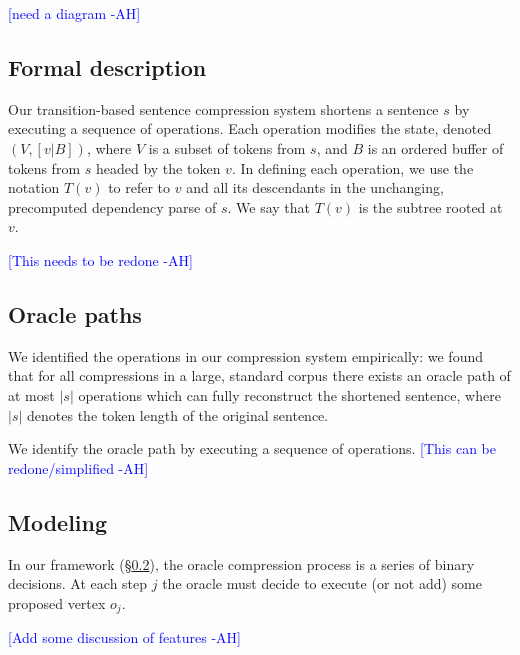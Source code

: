 \documentclass[11pt,a4paper]{article}
\newcommand{\ahcomment}[1]{\textcolor{blue}{[#1 -AH]}}
\begin{document}
\ahcomment{need a diagram}



\subsection{Formal description}\label{s:formal}

Our transition-based sentence compression system shortens a sentence $s$ by executing a sequence of operations. Each operation modifies the state, denoted $(V,[v|B])$, where $V$ is a subset of tokens from $s$, and $B$ is an ordered buffer of tokens from $s$ headed by the token $v$. In defining each operation, we use the notation $T(v)$ to refer to $v$ and all its descendants in the unchanging, precomputed dependency parse of $s$. We say that $T(v)$ is the subtree rooted at $v$.

\ahcomment{This needs to be redone}

\subsection{Oracle paths}\label{s:oracle}

We identified the operations in our compression system empirically: we found that for all compressions in a large, standard corpus \cite{filippova2013overcoming} there exists an oracle path of at most $|s|$ operations which can fully reconstruct the shortened sentence, where $|s|$ denotes the token length of the original sentence.

We identify the oracle path by executing a sequence of operations. \ahcomment{This can be redone/simplified}

\subsection{Modeling}\label{s:modeling}

In our framework (\S\ref{s:oracle}), the oracle compression process is a series of binary decisions. At each step $j$ the oracle must decide to execute (or not add) some proposed vertex $o_j$.

\ahcomment{Add some discussion of features}
\end{document}
